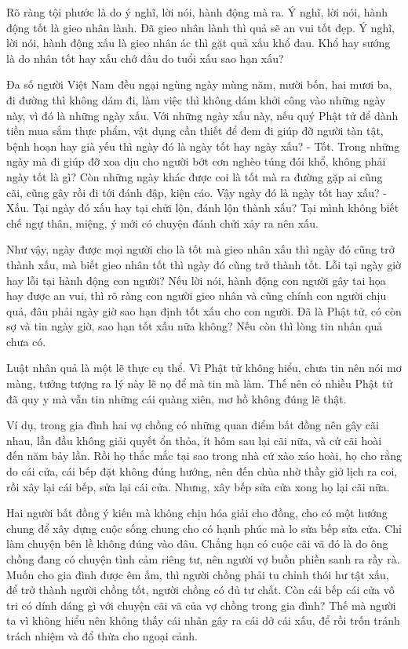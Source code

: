\documentclass[
  12pt,
  oneside]{book}
\begin{document}
Rõ ràng tội phước là do ý nghĩ, lời nói, hành động mà ra. Ý nghĩ, lời nói, hành động tốt là gieo nhân lành. Đã gieo nhân lành thì quả sẽ an vui tốt đẹp. Ý nghĩ, lời nói, hành động xấu là gieo nhân ác thì gặt quả xấu khổ đau. Khổ hay sướng là do nhân tốt hay xấu chớ đâu do tuổi xấu sao hạn xấu?

Đa số người Việt Nam đều ngại ngùng ngày mùng năm, mười bốn, hai mươi ba, đi đường thì không dám đi, làm việc thì không dám khởi công vào những ngày này, vì đó là những ngày xấu. Với những ngày xấu này, nếu quý Phật tử để dành tiền mua sắm thực phẩm, vật dụng cần thiết để đem đi giúp đỡ người tàn tật, bệnh hoạn hay già yếu thì ngày đó là ngày tốt hay ngày xấu? - Tốt. Trong những ngày mà đi giúp đỡ xoa dịu cho người bớt cơn nghèo túng đói khổ, không phải ngày tốt là gì? Còn những ngày khác được coi là tốt mà ra đường gặp ai cũng cãi, cũng gây rồi đi tới đánh đập, kiện cáo. Vậy ngày đó là ngày tốt hay xấu? - Xấu. Tại ngày đó xấu hay tại chửi lộn, đánh lộn thành xấu? Tại mình không biết chế ngự thân, miệng, ý mới có chuyện đánh chửi xảy ra nên xấu.

Như vậy, ngày được mọi người cho là tốt mà gieo nhân xấu thì ngày đó cũng trở thành xấu, mà biết gieo nhân tốt thì ngày đó cũng trở thành tốt. Lỗi tại ngày giờ hay lỗi tại hành động con người? Nếu lời nói, hành động con người gây tai họa hay được an vui, thì rõ ràng con người gieo nhân và cũng chính con người chịu quả, đâu phải ngày giờ sao hạn định tốt xấu cho con người. Đã là Phật tử, có còn sợ và tin ngày giờ, sao hạn tốt xấu nữa không? Nếu còn thì lòng tin nhân quả chưa có.

Luật nhân quả là một lẽ thực cụ thể. Vì Phật tử không hiểu, chưa tin nên nói mơ màng, tưởng tượng ra lý này lẽ nọ để mà tin mà làm. Thế nên có nhiều Phật tử đã quy y mà vẫn tin những cái quàng xiên, mơ hồ không đúng lẽ thật.

Ví dụ, trong gia đình hai vợ chồng có những quan điểm bất đồng nên gây cãi nhau, lần đầu không giải quyết ổn thỏa, ít hôm sau lại cãi nữa, và cứ cãi hoài đến năm bảy lần. Rồi họ thắc mắc tại sao trong nhà cứ xào xáo hoài, họ cho rằng do cái cửa, cái bếp đặt không đúng hướng, nên đến chùa nhờ thầy giở lịch ra coi, rồi xây lại cái bếp, sửa lại cái cửa. Nhưng, xây bếp sửa cửa xong họ lại cãi nữa.

Hai người bất đồng ý kiến mà không chịu hóa giải cho đồng, cho có một hướng chung để xây dựng cuộc sống chung cho có hạnh phúc mà lo sửa bếp sửa cửa. Chỉ làm chuyện bên lề không đúng vào đâu. Chẳng hạn có cuộc cãi vã đó là do ông chồng đang có chuyện tình cảm riêng tư, nên người vợ buồn phiền sanh ra rầy rà. Muốn cho gia đình được êm ấm, thì người chồng phải tu chỉnh thói hư tật xấu, để trở thành người chồng tốt, người chồng có đủ tư chất. Còn cái bếp cái cửa vô tri có dính dáng gì với chuyện cãi vã của vợ chồng trong gia đình? Thế mà người ta vì không hiểu nên không thấy cái nhân gây ra cái dở cái xấu, để rồi trốn tránh trách nhiệm và đổ thừa cho ngoại cảnh.
\end{document}
